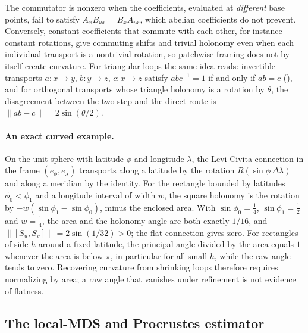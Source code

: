 
The commutator is nonzero when the coefficients, evaluated at \emph{different} base points, fail to satisfy $A_xB_{ux}=B_xA_{vx}$, which abelian coefficients do not prevent.
Conversely, constant coefficients that commute with each other, for instance constant rotations, give commuting shifts and trivial holonomy even when each individual transport is a nontrivial rotation, so patchwise framing does not by itself create curvature.
For triangular loops the same idea reads: invertible transports $a\colon x\to y$, $b\colon y\to z$, $c\colon x\to z$ satisfy $ab c^{-1}=1$ if and only if $ab=c$ (), and for orthogonal transports whose triangle holonomy is a rotation by $\theta$, the disagreement between the two-step and the direct route is $\|ab-c\|=2\sin(\theta/2)$.

\paragraph{An exact curved example.}
On the unit sphere with latitude $\phi$ and longitude $\lambda$, the Levi-Civita connection in the frame $(e_\phi,e_\lambda)$ transports along a latitude by the rotation $R(\sin\phi\,\Delta\lambda)$ and along a meridian by the identity.
For the rectangle bounded by latitudes $\phi_0<\phi_1$ and a longitude interval of width $w$, the square holonomy is the rotation by $-w(\sin\phi_1-\sin\phi_0)$, minus the enclosed area.
With $\sin\phi_0=\tfrac14$, $\sin\phi_1=\tfrac12$ and $w=\tfrac14$, the area and the holonomy angle are both exactly $1/16$, and $\|[S_u,S_v]\|=2\sin(1/32)>0$; the flat connection gives zero.
For rectangles of side $h$ around a fixed latitude, the principal angle divided by the area equals $1$ whenever the area is below $\pi$, in particular for all small $h$, while the raw angle tends to zero.
Recovering curvature from shrinking loops therefore requires normalizing by area; a raw angle that vanishes under refinement is not evidence of flatness.

\subsection{The local-MDS and Procrustes estimator}
\label{sec:mds-estimator}

